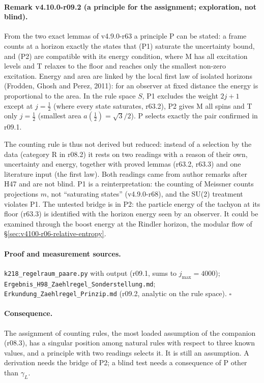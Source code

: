 \paragraph{Remark v4.10.0-r09.2 (a principle for the assignment; exploration, not blind).}
From the two exact lemmas of v4.9.0-r63 a principle P can be stated: a frame counts at a horizon exactly the states that
(P1) saturate the uncertainty bound, and (P2) are compatible with its energy condition, where M has all excitation levels and T relaxes to the floor and
reaches only the smallest non-zero excitation.  Energy and area are linked by the local first law of isolated horizons (Frodden, Ghosh and Perez,
2011): for an observer at fixed distance the energy is proportional to the area.  In the rule space \(S\), P1 excludes the weight \(2j+1\) except at
\(j=\tfrac12\) (where every state saturates, r63.2), P2 gives M all spins and T only \(j=\tfrac12\) (smallest area \(a(\tfrac12)=\sqrt3/2\)).  P selects exactly the
pair confirmed in r09.1.

The counting rule is thus not derived but reduced: instead of a selection by the data (category R in r08.2) it rests on two readings with a reason of
their own, uncertainty and energy, together with proved lemmas (r63.2, r63.3) and one literature input (the first law).  Both readings came from author
remarks after H47 and are not blind.  P1 is a reinterpretation: the counting of Meissner counts projections \(m\), not ``saturating states''
(v4.9.0-r68), and the SU(2) treatment violates P1.  The untested bridge is in P2: the particle energy of the tachyon at its floor (r63.3) is identified
with the horizon energy seen by an observer.  It could be examined through the boost energy at the Rindler horizon, the modular flow of
\S\ref{sec:v4100-r06-relative-entropy}.

\paragraph{Proof and measurement sources.}
\texttt{k218\_\allowbreak regelraum\_\allowbreak paare.py} with output (r09.1, sums to \(j_{\max}=4000\)); \texttt{Ergebnis\_\allowbreak H98\_\allowbreak Zaehlregel\_\allowbreak Sonderstellung.md};
\texttt{Erkundung\_\allowbreak Zaehlregel\_\allowbreak Prinzip.md} (r09.2, analytic on the rule space).  \(\square\)

\paragraph{Consequence.}
The assignment of counting rules, the most loaded assumption of the companion (r08.3), has a singular position among natural rules with respect to
three known values, and a principle with two readings selects it.  It is still an assumption.  A derivation needs the bridge of P2; a blind test needs a
consequence of P other than \(\gamma_L\).

